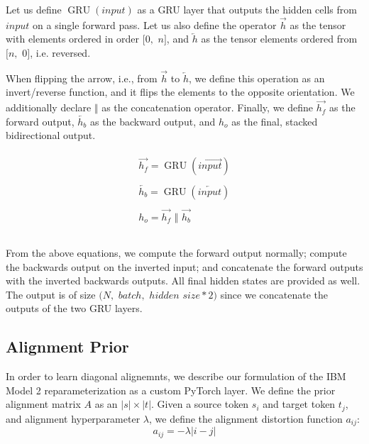 \documentclass[twoside,twocolumn]{article}
\begin{document}
Let us define $\operatorname{GRU}(input)$ as a GRU layer that outputs the
hidden cells from $input$ on a single forward pass. Let us also define the
operator $\overrightarrow{h}$ as the tensor with elements ordered in
order $[0,$ $n]$, and $\overleftarrow{h}$ as the tensor elements ordered
from $[n,$ $0]$, i.e. reversed.

When flipping the arrow, i.e., from $\overrightarrow{h}$ to
$\overleftarrow{h}$, we define this operation as an invert/reverse
function, and it flips the elements to the opposite orientation. We
additionally declare $\Vert$ as the concatenation operator. Finally, we
define $\overrightarrow{h_f}$ as the forward output, $\overleftarrow{h_b}$
as the backward output, and $h_o$ as the final, stacked bidirectional output.

\begin{equation}
  \label{eq:bidirectional}
  \begin{split}
    \begin{array}{ll}
      \overrightarrow{h_f} = \operatorname{GRU}(\overrightarrow{input})\\
      \\
      \overleftarrow{h_b} = \operatorname{GRU}(\overleftarrow{input})\\
      \\
      h_o = \overrightarrow{h_f} \,\,\Vert \,\, \overrightarrow{h_b}\\
      \\
    \end{array}
  \end{split}
\end{equation}

From the above equations, we compute the forward output normally;
compute the backwards output on the inverted input; and concatenate
the forward outputs with the inverted backwards outputs. All final
hidden states are provided as well. The output is of
size $(N,$ $batch,$ $hidden$ $size*2)$ since we concatenate the
outputs of the two GRU layers.


\subsection{Alignment Prior}
\label{sec:alingment_prior}
In order to learn diagonal alignemnts, we describe our formulation of the
IBM Model 2 reparameterization as a custom PyTorch layer. We define the
prior alignment matrix $A$ as an $|s| \times |t|$. Given a source token
$s_i$ and target token $t_j$, and alignment hyperparameter $\lambda$, we
define the alignment distortion function $a_{ij}$:
\begin{equation}
  a_{ij} = -\lambda | i - j |
\end{equation}
\end{document}
